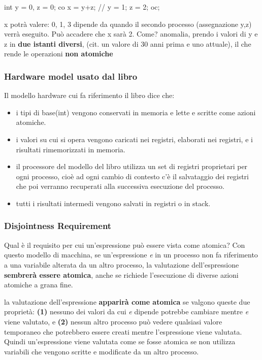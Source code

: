 \documentclass[10pt,a4paper]{article}
\begin{document}
int y = 0, z = 0;
co x = y+z; // y = 1; z = 2; oc;

x potrà valere: 0, 1, 3 dipende da quando il secondo processo (assegnazione y,z) verrà eseguito. Può accadere che x sarà 2. Come? anomalia, prendo i valori di y e z in \textbf{due istanti diversi}, (cit. un valore di 30 anni prima e uno attuale), il che rende le operazioni \textbf{non atomiche}

\subsubsection{Hardware model usato dal libro}
Il modello hardware cui fa riferimento il libro dice che:
\begin{itemize}
\item i tipi di base(int) vengono conservati in memoria e lette e scritte come azioni atomiche.
\item i valori su cui si opera vengono caricati nei registri, elaborati nei registri, e i risultati rimemorizzati in memoria.
\item il processore del modello del libro utilizza un set di registri proprietari per ogni processo, cioè ad ogni cambio di contesto c'è il salvataggio dei registri che poi verranno recuperati alla successiva esecuzione del processo.
\item tutti i risultati intermedi vengono salvati in registri o in stack.
\end{itemize}

\subsubsection{Disjointness Requirement}
Qual è il requisito per cui un'espressione può essere vista come atomica?
Con questo modello di macchina, se un'espressione \textit{e} in un processo non fa riferimento a una
variabile alterata da un altro processo, la valutazione dell'espressione \textbf{sembrerà essere
atomica}, anche se richiede l'esecuzione di diverse azioni atomiche a grana fine. 

la valutazione dell'espressione \textbf{apparirà come atomica} se valgono queste due proprietà: \textbf{(1)} nessuno dei valori da cui \textit{e} dipende potrebbe cambiare mentre
\textit{e} viene valutato, e \textbf{(2)} nessun altro processo può vedere qualsiasi valore temporaneo che
potrebbero essere creati mentre l'espressione viene valutata. 
Quindi un'espressione viene valutata come se fosse atomica se non utilizza variabili che vengono scritte e modificate da un altro processo.
\end{document}
